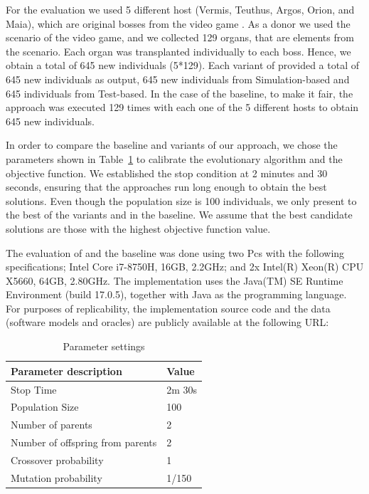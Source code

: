 For the evaluation we used 5 different host (Vermis, Teuthus, Argos, Orion, and Maia), which are original bosses from the video game \CaseStudy{}. As a donor we used the scenario of the video game, and we collected 129 organs, that are elements from the scenario. Each organ was transplanted individually to each boss. Hence, we obtain a total of 645 new individuals (5*129). Each variant of \ApproachName{} provided a total of 645 new individuals as output, 645 new individuals from Simulation-based and 645 individuals from Test-based. In the case of the baseline, to make it fair, the approach was executed 129 times with each one of the 5 different hosts to obtain 645 new individuals.

In order to compare the baseline and variants of our approach, we chose the parameters shown in Table~\ref{tab:evaluation_parameters} to calibrate the evolutionary algorithm and the objective function. We established the stop condition at 2 minutes and 30 seconds, ensuring that the approaches run long enough to obtain the best solutions. Even though the population size is 100 individuals, we only present to the best of the variants and in the baseline. We assume that the best candidate solutions are those with the highest objective function value.

The evaluation of \ApproachName{} and the baseline was done
using two Pcs with the following specifications; Intel Core i7-8750H, 16GB, 2.2GHz; and  2x Intel(R) Xeon(R) CPU X5660, 64GB, 2.80GHz.
The implementation uses the Java(TM) SE Runtime Environment (build 17.0.5), together with Java as the programming language. 
For purposes of replicability, the implementation source code and the data (software models and oracles) are publicly available at the following URL:



\begin{table}[h]
    \centering
    \begin{tabular}{ll}
        \hline
        \bf{Parameter description}            & \bf{Value}  \\ \hline
        Stop Time                        & 2m 30s \\
        Population Size                  & 100    \\
        Number of parents                & 2      \\
        Number of offspring from parents & 2      \\
        Crossover probability            & 1      \\
        Mutation probability             & 1/150 \\ \hline
    \end{tabular}
    \caption{Parameter settings}
    \label{tab:evaluation_parameters}
    \end{table}


